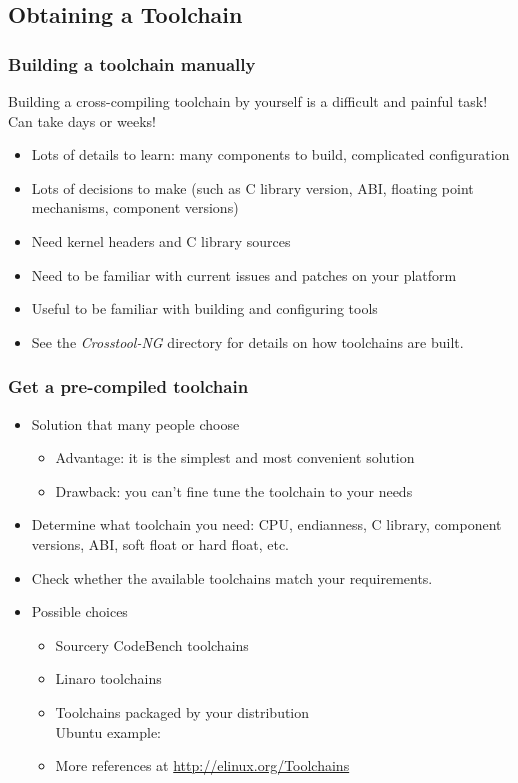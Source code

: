 \subsection{Obtaining a Toolchain}

\begin{frame}
  \frametitle{Building a toolchain manually}

  Building a cross-compiling toolchain by yourself is a difficult and painful
  task! Can take days or weeks!
  \begin{itemize}
  \item Lots of details to learn: many components to build, complicated
    configuration
  \item Lots of decisions to make (such as C library version, ABI, floating point
    mechanisms, component versions)
  \item Need kernel headers and C library sources
  \item Need to be familiar with current  issues and patches
    on your platform
  \item Useful to be familiar with building and configuring tools
  \item See the {\em Crosstool-NG}  directory for details
    on how toolchains are built.
\end{itemize}
\end{frame}

\begin{frame}
  \frametitle{Get a pre-compiled toolchain}
  \begin{itemize}
  \item Solution that many people choose
    \begin{itemize}
    \item Advantage: it is the simplest and most convenient solution
    \item Drawback: you can't fine tune the toolchain to your needs
    \end{itemize}
  \item Determine what toolchain you need: CPU, endianness, C library, component
    versions, ABI, soft float or hard float, etc.
  \item Check whether the available toolchains match your requirements.
  \item Possible choices
    \begin{itemize}
    \item Sourcery CodeBench toolchains
    \item Linaro toolchains
    \item Toolchains packaged by your distribution\\
	  Ubuntu example: 
    \item More references at \url{http://elinux.org/Toolchains}
    \end{itemize}
  \end{itemize}
\end{frame}

